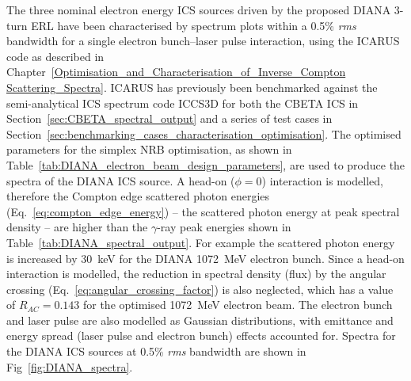 \documentclass[../main.tex]{subfiles}
\begin{document}
The three nominal electron energy ICS sources driven by the proposed DIANA 3-turn ERL have been characterised by spectrum plots within a 0.5\% \textit{rms} bandwidth for a single electron bunch--laser pulse interaction, using the \textsc{ICARUS} code as described in Chapter~\ref{Optimisation_and_Characterisation_of_Inverse_Compton Scattering_Spectra}. \textsc{ICARUS} has previously been benchmarked against the semi-analytical ICS spectrum code \textsc{ICCS3D} \cite{krafft2016laser,ranjan2018simulation} for both the CBETA ICS in Section~\ref{sec:CBETA_spectral_output} and a series of test cases in Section~\ref{sec:benchmarking_cases_characterisation_optimisation}. The optimised parameters for the simplex NRB optimisation, as shown in Table~\ref{tab:DIANA_electron_beam_design_parameters}, are used to produce the spectra of the DIANA ICS source. A head-on ($\phi=0$) interaction is modelled, therefore the Compton edge scattered photon energies (Eq.~\ref{eq:compton_edge_energy}) -- the scattered photon energy at peak spectral density -- are higher than the $\gamma$-ray peak energies shown in Table~\ref{tab:DIANA_spectral_output}. For example the scattered photon energy is increased by 30~\si{\kilo\electronvolt} for the DIANA 1072~\si{\mega\electronvolt} electron bunch. Since a head-on interaction is modelled, the reduction in spectral density (flux) by the angular crossing (Eq.~\ref{eq:angular_crossing_factor}) is also neglected, which has a value of $R_{AC}=0.143$ for the optimised 1072~\si{\mega\electronvolt} electron beam.
The electron bunch and laser pulse are also modelled as Gaussian distributions, with emittance and energy spread (laser pulse and electron bunch) effects accounted for. Spectra for the DIANA ICS sources at 0.5\% \textit{rms} bandwidth are shown in Fig~\ref{fig:DIANA_spectra}.
\end{document}
